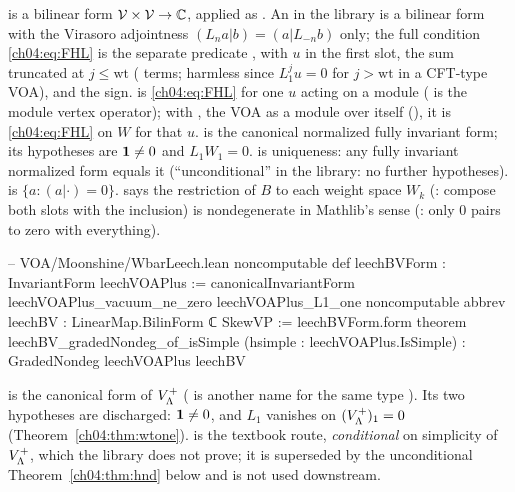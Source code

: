 \begin{dictionary}
 is a bilinear form $\mathcal V\times\mathcal V\to{\mathbb{C}}$, applied as
. An  in the library is a bilinear form with the Virasoro
adjointness $(L_na|b)=(a|L_{-n}b)$ only; the full condition \eqref{ch04:eq:FHL} is the separate
predicate , with $u$ in the first slot, the sum truncated at $j\le\mathrm{wt}$
( terms; harmless since $L_1^ju=0$ for $j>\mathrm{wt}$ in a CFT-type VOA), and
 the sign.  is \eqref{ch04:eq:FHL} for one $u$ acting on a
module  ( is the module vertex operator); with , the
VOA as a module over itself (), it is \eqref{ch04:eq:FHL} on $W$ for that $u$.
 is the canonical normalized fully invariant form; its
hypotheses are $\mathbf{1}\neq0$ and $L_1W_1=0$.  is uniqueness: any
fully invariant normalized form equals it (``unconditional'' in the library: no further
hypotheses).  is $\{a:(a|\cdot)=0\}$.  says the restriction
of $B$ to each weight space $W_k$ (: compose both slots with the inclusion) is
nondegenerate in Mathlib's sense (: only $0$ pairs to zero with everything).
\end{dictionary}

\begin{leancode}
-- VOA/Moonshine/WbarLeech.lean
noncomputable def leechBVForm : InvariantForm leechVOAPlus :=
  canonicalInvariantForm leechVOAPlus_vacuum_ne_zero leechVOAPlus_L1_one
noncomputable abbrev leechBV : LinearMap.BilinForm ℂ SkewVP := leechBVForm.form
theorem leechBV_gradedNondeg_of_isSimple (hsimple : leechVOAPlus.IsSimple) :
    GradedNondeg leechVOAPlus leechBV
\end{leancode}

\begin{dictionary}
 is the canonical form of $V_{\Lambda}^+$ ( is another name for the same
type ). Its two hypotheses are discharged: $\mathbf{1}\neq0$, and $L_1$ vanishes on
$(V_{\Lambda}^+)_1=0$ (Theorem~\ref{ch04:thm:wtone}).  is the
textbook route, \emph{conditional} on simplicity of $V_{\Lambda}^+$, which the library does not prove;
it is superseded by the unconditional Theorem~\ref{ch04:thm:hnd} below and is not used downstream.
\end{dictionary}

